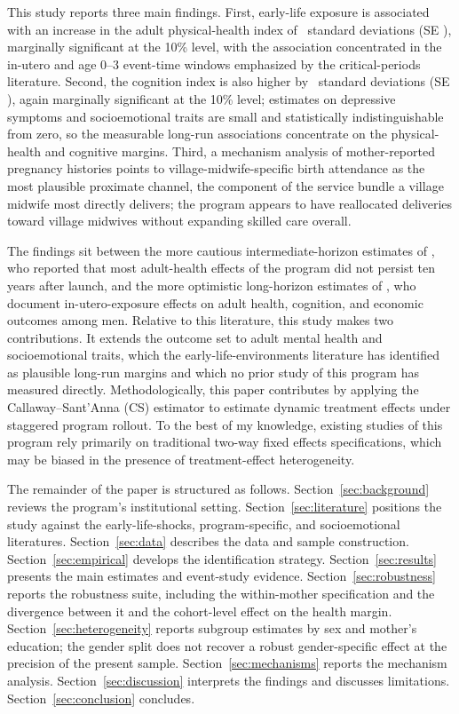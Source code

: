 This study reports three main findings. First, early-life exposure is associated with an increase in the adult physical-health index of \CoefHealthCS\ standard deviations (SE \SEHealthCS), marginally significant at the 10\% level, with the association concentrated in the in-utero and age 0--3 event-time windows emphasized by the critical-periods literature. Second, the cognition index is also higher by \CoefCogCS\ standard deviations (SE \SECogCS), again marginally significant at the 10\% level; estimates on depressive symptoms and socioemotional traits are small and statistically indistinguishable from zero, so the measurable long-run associations concentrate on the physical-health and cognitive margins. Third, a mechanism analysis of mother-reported pregnancy histories points to village-midwife-specific birth attendance as the most plausible proximate channel, the component of the service bundle a village midwife most directly delivers; the program appears to have reallocated deliveries toward village midwives without expanding skilled care overall.

The findings sit between the more cautious intermediate-horizon estimates of \textcite{triyana2016}, who reported that most adult-health effects of the program did not persist ten years after launch, and the more optimistic long-horizon estimates of \textcite{ahsan2021}, who document in-utero-exposure effects on adult health, cognition, and economic outcomes among men. Relative to this literature, this study makes two contributions. It extends the outcome set to adult mental health and socioemotional traits, which the early-life-environments literature has identified as plausible long-run margins \autocite{webb2024} and which no prior study of this program has measured directly. Methodologically, this paper contributes by applying the Callaway–Sant’Anna (CS) estimator to estimate dynamic treatment effects under staggered program rollout. To the best of my knowledge, existing studies of this program rely primarily on traditional two-way fixed effects specifications, which may be biased in the presence of treatment-effect heterogeneity.

The remainder of the paper is structured as follows. Section~\ref{sec:background} reviews the program's institutional setting. Section~\ref{sec:literature} positions the study against the early-life-shocks, program-specific, and socioemotional literatures. Section~\ref{sec:data} describes the data and sample construction. Section~\ref{sec:empirical} develops the identification strategy. Section~\ref{sec:results} presents the main estimates and event-study evidence. Section~\ref{sec:robustness} reports the robustness suite, including the within-mother specification and the divergence between it and the cohort-level effect on the health margin. Section~\ref{sec:heterogeneity} reports subgroup estimates by sex and mother's education; the gender split does not recover a robust gender-specific effect at the precision of the present sample. Section~\ref{sec:mechanisms} reports the mechanism analysis. Section~\ref{sec:discussion} interprets the findings and discusses limitations. Section~\ref{sec:conclusion} concludes.
